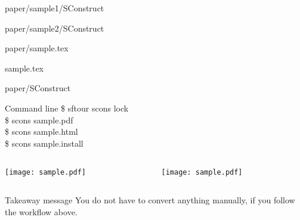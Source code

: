 \begin{frame}
  \begin{block}{paper/sample1/SConstruct}
  
  \end{block}
  \begin{block}{paper/sample2/SConstruct}
  
  \end{block}
\end{frame}

\begin{frame}
  \begin{block}{paper/sample.tex}
  
                   {sample.tex}
  \end{block}
\end{frame}

\begin{frame}
  \begin{block}{paper/SConstruct}
  
  
  \end{block}
  \begin{block}{Command line}
    \$ sftour scons lock \\
    \$ scons sample.pdf \\
    \$ scons sample.html \\
    \$ scons sample.install
  \end{block}
\end{frame}

\begin{frame}
  \begin{columns}
    \begin{column}{5.5cm}
      \begin{block}{}
      \texttt{[image: sample.pdf]}
      \end{block}
    \end{column}
    \begin{column}{5.5cm}
      \begin{block}{}
      \texttt{[image: sample.pdf]}
      \end{block}
    \end{column}
  \end{columns}
\end{frame}

\begin{frame}
  \begin{block}{Takeaway message}
    You do not have to convert anything manually, if you follow the workflow above.
  \end{block}
\end{frame}

